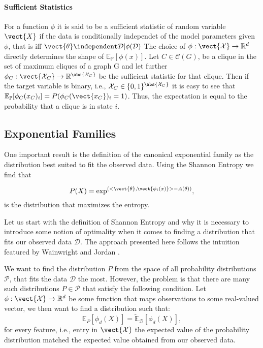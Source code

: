 \paragraph*{Sufficient Statistics}
    For a function $\phi$ it is said to be a sufficient statistic of random variable $\vect{X}$ if the data is conditionally independet of the model parameters given $\phi$, that is iff $\vect{\theta}\independent \mathcal{D} \lvert \phi(\mathcal{D})$
    The choice of $\phi: \vect{\mathcal{X}} \rightarrow \mathbb{R}^d$ directly determines the shape of  $\mathbb{E}_{\mathbb{P}}[\phi(x)]$.
    Let $C \in \mathcal{C}(G)$, be a clique in the set of maximum cliques of a graph G and let further
    $\phi_C: \vect{\mathcal{X}_C} \rightarrow \mathbb{R}^{\abs{\mathcal{X}_C}}$ be the sufficient statistic for that clique.
    Then if the target variable is binary, i.e., $\mathcal{X}_C \in \{0,1\}^{\abs{\mathcal{X}_C}}$ it is easy to see that  $\mathbb{E}_{\mathbb{P}}[\phi_C(x_C)_i] = P(\phi_C(\vect{x_C})_i = 1)$.
    Thus, the expectation is equal to the probability that a clique is in state $i$.
    
    \subsection{Exponential Families}
    \label{ssec:expf}
    One important result is the definition of the canonical exponential family as the distribution best suited to fit the observed data.
    Using the Shannon Entropy we find that

    \begin{equation}
        P(X) = \exp^{(<\vect{\theta}, \vect{\phi_i(x)} > - A(\theta))},
    \end{equation}
    is the distribution that maximizes the entropy.

    Let us start with the definition of Shannon Entropy and why it is necessary to introduce some notion of optimality when it comes to finding a distribution that fits our observed data $\mathcal{D}$.
    The approach presented here follows the intuition featured by Wainwright and Jordan \cite{wainwright2008graphical}.

    We want to find the distribution $P$ from the space of all probability distributions $\mathcal{P}$, that fits the data  $\mathcal{D}$ the most.
    However, the problem is that there are many such distributions $P \in \mathcal{P}$ that satisfy the following condition. Let $\phi: \vect{\mathcal{X}}  \rightarrow \mathbb{R}^d$ be some function that maps observations to some real-valued vector, we then want to find a distribution such that:
    \begin{equation}
        \label{eq:expecval}
        \mathbb{E}_P[\phi_d(X)] = \tilde{\mathbb{E}}_{\mathcal{D}}[\phi_d(X)], 
    \end{equation}
    for every feature, i.e., entry in $\vect{\mathcal{X}}$ the expected value of the probability distribution matched the expected value obtained from our observed data.

